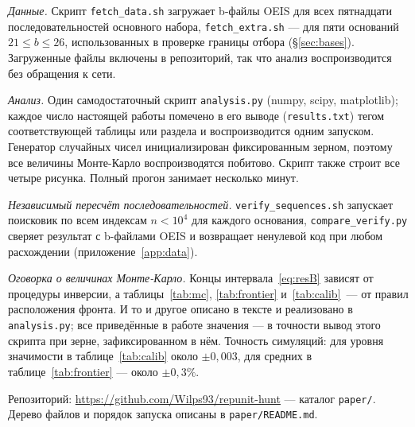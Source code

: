 \documentclass[11pt,a4paper]{article}
\theoremstyle{plain}
\theoremstyle{remark}
\begin{document}
\emph{Данные.} Скрипт \texttt{fetch\_data.sh} загружает b-файлы OEIS для всех
пятнадцати последовательностей основного набора, \texttt{fetch\_extra.sh} --- для
пяти оснований $21\le b\le26$, использованных в проверке границы отбора
(\S\ref{sec:bases}). Загруженные файлы включены в репозиторий, так что анализ
воспроизводится без обращения к сети.

\emph{Анализ.} Один самодостаточный скрипт \texttt{analysis.py} (numpy, scipy,
matplotlib); каждое число настоящей работы помечено в его выводе
(\texttt{results.txt}) тегом соответствующей таблицы или раздела и воспроизводится
одним запуском. Генератор случайных чисел инициализирован фиксированным зерном,
поэтому все величины Монте-Карло воспроизводятся побитово. Скрипт также строит
все четыре рисунка. Полный прогон занимает несколько минут.

\emph{Независимый пересчёт последовательностей.} \texttt{verify\_sequences.sh}
запускает поисковик по всем индексам $n<10^4$ для каждого основания,
\texttt{compare\_verify.py} сверяет результат с b-файлами OEIS и возвращает
ненулевой код при любом расхождении (приложение~\ref{app:data}).

\emph{Оговорка о величинах Монте-Карло.} Концы интервала~\eqref{eq:resB} зависят от
процедуры инверсии, а таблицы~\ref{tab:mc}, \ref{tab:frontier} и~\ref{tab:calib}~---
от правил расположения фронта. И то и другое описано в тексте и реализовано в
\texttt{analysis.py}; все приведённые в работе значения --- в точности вывод этого
скрипта при зерне, зафиксированном в нём. Точность симуляций: для уровня
значимости в таблице~\ref{tab:calib} около $\pm0{,}003$, для средних в
таблице~\ref{tab:frontier} --- около $\pm0{,}3\%$.

Репозиторий: \url{https://github.com/Wilps93/repunit-hunt} --- каталог
\texttt{paper/}. Дерево файлов и порядок запуска описаны в \texttt{paper/README.md}.
\end{document}
